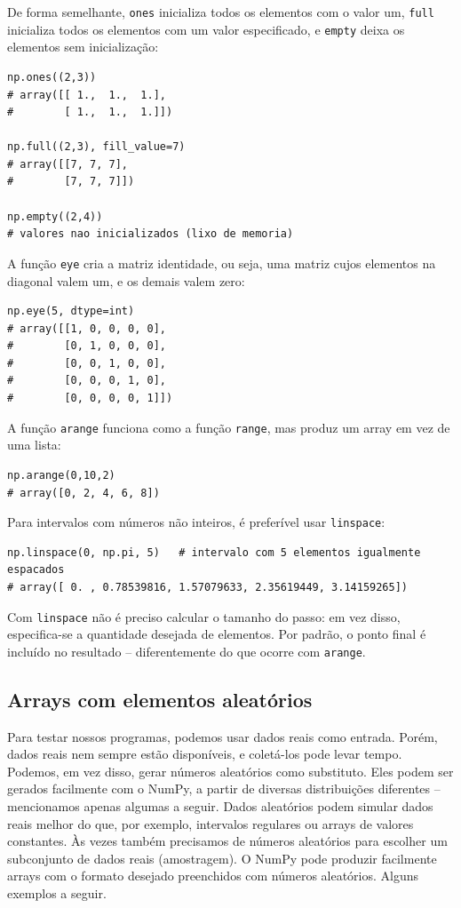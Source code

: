 \documentclass[11pt,a4paper]{article}
\begin{document}
De forma semelhante, \texttt{ones} inicializa todos os elementos com o
valor um, \texttt{full} inicializa todos os elementos com um valor
especificado, e \texttt{empty} deixa os elementos sem inicialização:

\begin{lstlisting}
np.ones((2,3))
# array([[ 1.,  1.,  1.],
#        [ 1.,  1.,  1.]])

np.full((2,3), fill_value=7)
# array([[7, 7, 7],
#        [7, 7, 7]])

np.empty((2,4))
# valores nao inicializados (lixo de memoria)
\end{lstlisting}

A função \texttt{eye} cria a matriz identidade, ou seja, uma matriz cujos
elementos na diagonal valem um, e os demais valem zero:

\begin{lstlisting}
np.eye(5, dtype=int)
# array([[1, 0, 0, 0, 0],
#        [0, 1, 0, 0, 0],
#        [0, 0, 1, 0, 0],
#        [0, 0, 0, 1, 0],
#        [0, 0, 0, 0, 1]])
\end{lstlisting}

A função \texttt{arange} funciona como a função \texttt{range}, mas
produz um array em vez de uma lista:

\begin{lstlisting}
np.arange(0,10,2)
# array([0, 2, 4, 6, 8])
\end{lstlisting}

Para intervalos com números não inteiros, é preferível usar
\texttt{linspace}:

\begin{lstlisting}
np.linspace(0, np.pi, 5)   # intervalo com 5 elementos igualmente espacados
# array([ 0. , 0.78539816, 1.57079633, 2.35619449, 3.14159265])
\end{lstlisting}

Com \texttt{linspace} não é preciso calcular o tamanho do passo: em vez
disso, especifica-se a quantidade desejada de elementos. Por padrão, o
ponto final é incluído no resultado -- diferentemente do que ocorre com
\texttt{arange}.

\subsection{Arrays com elementos aleatórios}

Para testar nossos programas, podemos usar dados reais como entrada.
Porém, dados reais nem sempre estão disponíveis, e coletá-los pode levar
tempo. Podemos, em vez disso, gerar números aleatórios como substituto.
Eles podem ser gerados facilmente com o NumPy, a partir de diversas
distribuições diferentes -- mencionamos apenas algumas a seguir. Dados
aleatórios podem simular dados reais melhor do que, por exemplo,
intervalos regulares ou arrays de valores constantes. Às vezes também
precisamos de números aleatórios para escolher um subconjunto de dados
reais (amostragem). O NumPy pode produzir facilmente arrays com o
formato desejado preenchidos com números aleatórios. Alguns exemplos a
seguir.
\end{document}

